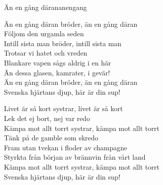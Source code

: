 \begin{song}{Än en gång däran}{anengang}
\begin{vers}
Än en gång däran bröder, än en gång däran\\
Följom den urgamla seden\\
Intill sista man bröder, intill sista man\\
Trotsar vi hatet och vreden\\
Blankare vapen sågs aldrig i en här\\
Än dessa glasen, kamrater, i gevär!\\
Än en gång däran bröder, än en gång däran\\
Svenska hjärtans djup, här är din sup!\\
\end{vers}
\begin{vers}
Livet är så kort systrar, livet är så kort\\
Lek det ej bort, nej var redo\\
Kämpa mot allt torrt systrar, kämpa mot allt torrt\\
Tänk på de gamble som skredo\\
Fram utan tvekan i floder av champagne\\
Styrkta från början av brännvin från vårt land\\
Kämpa mot allt torrt systrar, kämpa mot allt torrt\\
Svenska hjärtans djup, här är din sup!\\
\end{vers}
\end{song}

